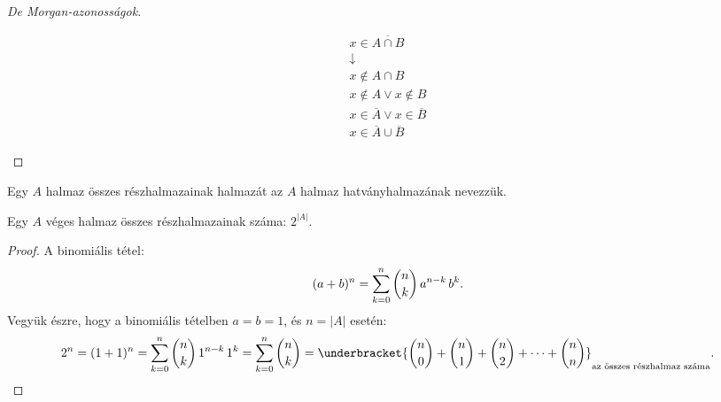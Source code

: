 \begin{theorem}
\begin{proof}[De Morgan-azonosságok]
\begin{multicols}{2}
      \begin{gather*}
        x \in \overline{A \cap B}
        \\
        \downarrow
        \\
        x \notin A \cap B
        \\
        x \notin A \lor x \notin B
        \\
        x \in \overline A \lor x \in \overline B
        \\
        x \in \overline A \cup \overline B
      \end{gather*}
    \end{multicols}
  \end{proof}
\end{theorem}

\begin{definition}[Hatványhalmaz]
  Egy $A$ halmaz összes részhalmazainak halmazát az $A$ halmaz hatványhalmazának
  nevezzük.
\end{definition}

\begin{statement}
  Egy $A$ véges halmaz összes részhalmazainak száma: $2^{|A|}$.

  \begin{proof}
    A binomiális tétel:
    \[
      (a + b)^n = \sum_{k=0}^{n} \binom{n}{k} \, a^{n-k} \, b^k
      \text.
    \]
    Vegyük észre, hogy a binomiális tételben $a = b = 1$, és $n = |A|$ esetén:
    \[
      2^n
      = (1 + 1)^n
      = \sum_{k=0}^{n} \binom{n}{k} \, 1^{n-k} \, 1^k
      = \sum_{k=0}^{n} \binom{n}{k}
      = \underbracket{
        \binom n0 + \binom n1 + \binom n2 + \dots + \binom nn
      }_\text{az összes részhalmaz száma}
      \text.
    \]
  \end{proof}
\end{statement}

\clearpage